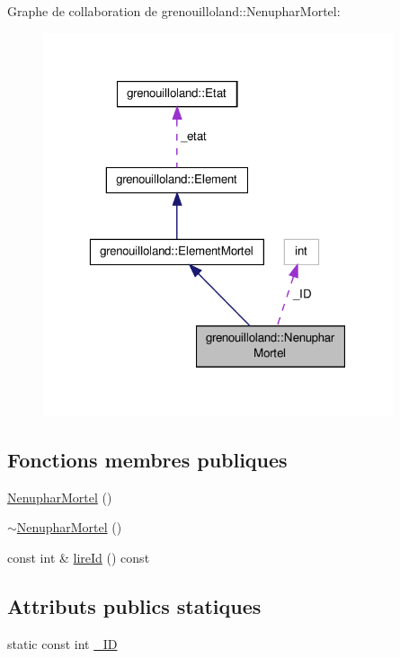 Graphe de collaboration de grenouilloland\-:\-:Nenuphar\-Mortel\-:
\nopagebreak
\begin{figure}[H]
\begin{center}
\leavevmode
\includegraphics[width=292pt]{classgrenouilloland_1_1NenupharMortel__coll__graph}
\end{center}
\end{figure}
\subsection*{Fonctions membres publiques}
\begin{DoxyCompactItemize}
\item 
\hyperlink{classgrenouilloland_1_1NenupharMortel_a6e130520aa36b6d049a0db7198da113e}{Nenuphar\-Mortel} ()
\item 
\hyperlink{classgrenouilloland_1_1NenupharMortel_a870864bde15f443491e66e463a73e525}{$\sim$\-Nenuphar\-Mortel} ()
\item 
const int \& \hyperlink{classgrenouilloland_1_1NenupharMortel_aac1c7add92c76c06a2848fe264a59bdd}{lire\-Id} () const 
\end{DoxyCompactItemize}
\subsection*{Attributs publics statiques}
\begin{DoxyCompactItemize}
\item 
static const int \hyperlink{classgrenouilloland_1_1NenupharMortel_aa64713741f9e0f83140b831dcab0f67f}{\-\_\-\-I\-D}
\end{DoxyCompactItemize}
